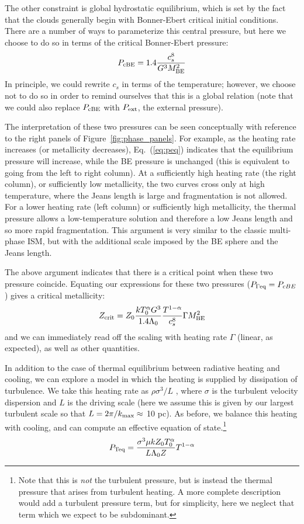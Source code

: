 \documentclass[useAMS,usenatbib]{mn2e}
\begin{document}
The other constraint is global hydrostatic equilibrium, which is set by the fact that the clouds generally begin with Bonner-Ebert critical initial conditions.  There are a number of ways to parameterize this central pressure, but here we choose to do so in terms of the critical Bonner-Ebert pressure:
\begin{equation}
P_{\rm cBE} = 1.4 \frac{ c_s^8}{G^3 M_{\rm BE}^2}
\end{equation}
In principle, we could rewrite $c_s$ in terms of the temperature; however, we choose not to do so in order to remind ourselves that this is a global relation (note that we could also replace $P_{\rm cBE}$ with $P_{\rm ext}$, the external pressure).

The interpretation of these two pressures can be seen conceptually with reference to the right panels of Figure~\ref{fig:phase_panels}.  For example, as the heating rate increases (or metallicity decreases), Eq.~(\ref{eq:peq}) indicates that the equilibrium pressure will increase, while the BE pressure is unchanged (this is equivalent to going from the left to right column).  At a sufficiently high heating rate (the right column), or sufficiently low metallicity, the two curves cross only at high temperature, where the Jeans length is large and fragmentation is not allowed.  For a lower heating rate (left column) or sufficiently high metallicity, the thermal pressure allows a low-temperature solution and therefore a low Jeans length and so more rapid fragmentation.  This argument is very similar to the classic multi-phase ISM, but with the additional scale imposed by the BE sphere and the Jeans length.

The above argument indicates that there is a critical point when these two pressure coincide.  Equating our expressions for these two pressures ($P_{\Gamma \rm eq} = P_{cBE}$) gives a critical metallicity:
\begin{equation}
Z_{\rm crit} = Z_0 \frac{ k T_0^\alpha G^3}{1.4 \Lambda_0 } \frac{T^{1-\alpha}}{c_s^8} \Gamma M_{\rm BE}^2
\label{eq:crit_zl}
\end{equation}
and we can immediately read off the scaling with heating rate $\Gamma$ (linear, as expected), as well as other quantities.

In addition to the case of thermal equilibrium between radiative heating and cooling, we can explore a model in which the heating is supplied by dissipation of turbulence.  We take this heating rate as $\rho \sigma^3 / L$ , where $\sigma$ is the turbulent velocity dispersion and $L$ is the driving scale (here we assume this is given by our largest turbulent scale so that $L = 2 \pi / k_{\rm max} \approx $ 10 pc).    As before, we balance this heating with cooling, and can compute an effective equation of state.\footnote{Note that this is {\it not} the turbulent pressure, but is instead the thermal pressure that arises from turbulent heating.  A more complete description would add a turbulent pressure term, but for simplicity, here we neglect that term which we expect to be subdominant.}
\begin{equation}
P_{\rm Teq} = \frac{\sigma^3 \mu k Z_0 T_0^{\alpha}}{L \Lambda_0 Z} T^{1-\alpha}
\label{eq:Teq}
\end{equation}
\end{document}

